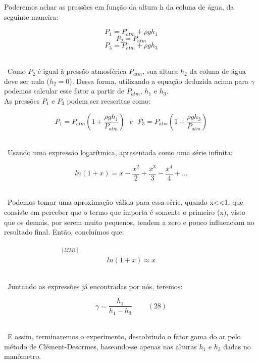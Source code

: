 Poderemos achar as pressões em função da altura h da coluna de água, da seguinte maneira:

\[ P_1 = P_{atm} + \rho g h_1 \]
\[ P_2 = P_{atm} \]
\[ P_3 = P_{atm} + \rho g h_3 \] \


\ Como $P_2$ é igual à pressão atmosférica $P_{atm}$, sua altura $h_2$ da coluna de água deve ser nula ($h_2 = 0 $). Dessa forma, utilizando a equação deduzida acima para $\gamma$ podemos calcular esse fator a partir de $P_{atm}$, $h_1$ e $h_3$.\\

As pressões $P_1$ e $P_3$ podem ser reescritas como:

\[ P_1 = P_{atm} ( 1 + \frac{\rho g h_1}{P_{atm}}) \ \ \  e \ \ \   P_3 = P_{atm} ( 1 + \frac{\rho g h_3}{P_{atm}})   \] \
 
\ Usando uma expressão logarítmica, apresentada como uma série infinita:

\[ ln(1 + x) = x - \frac{x^2}{2} + \frac{x^3}{3} - \frac{x^4}{4} + ...  \]\ 
 
\ Podemos tomar uma aproximação válida para essa série, quando x<<1, que consiste em perceber que o termo que importa é somente o primeiro (x), visto que os demais, por serem muito pequenos, tendem a zero e pouco influenciam no resultado final. Então, concluímos que: \ \ \ \ \ \ \ \ \ \ \ \ \ \ \ \ \ \ \ \ \ \ \ \ \ \ \ \ \ \ \ \ \ \ \ \ \ \ \ \ \ \ \ \ \ \ \ \ \ \ \ \ \ \ \ \ \ \ \ \ \ \ \ \ \ \ \ \ \ \ \ \ \ \ \ \ \ \ \ \ \ \ \ \ \ \ \ \ $^{[MM1]}$
\[ ln(1 + x) \approx x \] \

\ Juntando as expressões já encontradas por nós, teremos:

\[ \gamma = \frac{h_1}{h_1 - h_3}  \   \  \ \ \ \ \ \ \ \ (28) \] \ 

\ E assim, terminaremos o experimento, descobrindo o fator gama do ar pelo método de Clément-Desormes, baseando-se apenas nas alturas $h_1$ e $h_3$ dadas no manômetro.\\

